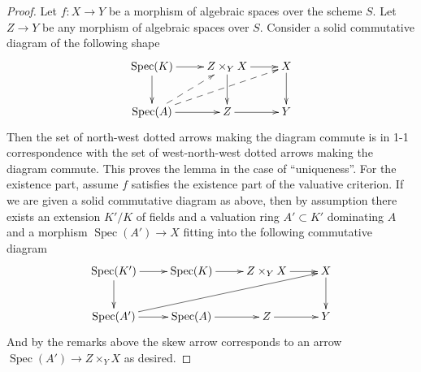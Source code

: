 \documentclass[10pt,a4paper]{amsart}
\theoremstyle{plain}
\theoremstyle{definition}
\theoremstyle{remark}
\numberwithin{equation}{subsection}
\def\Spec{\mathop{\mathrm{Spec}}}
\begin{document}
\begin{proof}
Let $f : X \to Y$ be a morphism of algebraic spaces over the scheme $S$.
Let $Z \to Y$ be any morphism of algebraic spaces over $S$.
Consider a solid commutative diagram of the following shape
$$
\xymatrix{
\Spec(K) \ar[r] \ar[d] & Z \times_Y X \ar[r] \ar[d] & X \ar[d] \\
\Spec(A) \ar[r] \ar@{-->}[ru] \ar@{-->}[rru] & Z \ar[r] & Y
}
$$
Then the set of north-west dotted arrows making the diagram commute
is in 1-1 correspondence with the set of west-north-west dotted arrows
making the diagram commute. This proves the lemma in the case of
``uniqueness''. For the existence part, assume $f$ satisfies the existence
part of the valuative criterion. If we are given a solid commutative
diagram as above, then by assumption there exists an extension $K'/K$
of fields and a valuation ring $A' \subset K'$ dominating $A$ and
a morphism $\Spec(A') \to X$ fitting into the following commutative
diagram
$$
\xymatrix{
\Spec(K') \ar[r] \ar[d] &
\Spec(K) \ar[r] & Z \times_Y X \ar[r] & X \ar[d] \\
\Spec(A') \ar[r] \ar[rrru] & \Spec(A) \ar[r] & Z \ar[r] & Y
}
$$
And by the remarks above the skew arrow corresponds to an arrow
$\Spec(A') \to Z \times_Y X$ as desired.
\end{proof}
\end{document}
